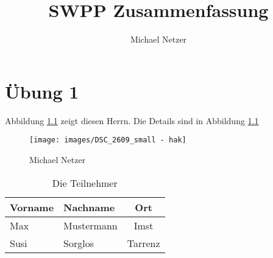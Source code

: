 \documentclass[ngerman]{report}
\title{SWPP Zusammenfassung}
\author{Michael Netzer}
\begin{document}
    \maketitle
    \tableofcontents
    \chapter{Übung 1}  
    Abbildung \ref{fig:portrait} zeigt diesen Herrn.
    Die Details sind in Abbildung \ref{tab:teilnehmer}
    
    \begin{figure}[h]
        \centering
        \texttt{[image: images/DSC\_2609\_small - hak]}
        \caption{Michael Netzer}
        \label{fig:portrait}
    \end{figure}
    
    \begin{table}[h]
        \begin{center}
            \begin{tabular}{ l  l | c }
             Vorname & Nachname & Ort \\
             \hline
             Max & Mustermann & Imst \\  
             Susi & Sorglos & Tarrenz    
            \end{tabular}
        \end{center}
        \caption{Die Teilnehmer}
        \label{tab:teilnehmer}
    \end{table}
 
\end{document}
